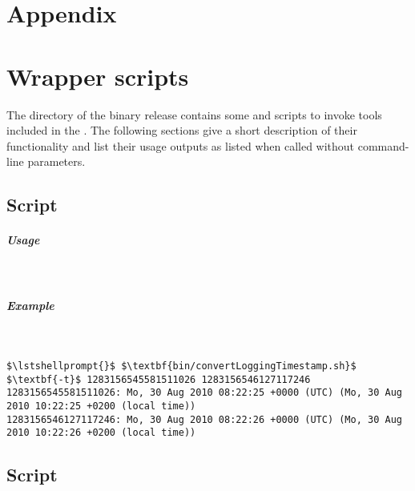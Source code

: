 % 


\appendix

\chapter*{Appendix}

\chapter{Wrapper scripts}

The  directory of the binary release contains some   and %
 scripts to invoke tools included in the \mainJar{}. %
The following sections give a short description of their functionality and %
list their usage outputs as listed when called without command-line parameters. %


\section{Script }

\paragraph*{Usage}\

\setTextListing


\paragraph*{Example}\

\setTextListing
\begin{lstlisting}
$\lstshellprompt{}$ $\textbf{bin/convertLoggingTimestamp.sh}$ $\textbf{-t}$ 1283156545581511026 1283156546127117246 
1283156545581511026: Mo, 30 Aug 2010 08:22:25 +0000 (UTC) (Mo, 30 Aug 2010 10:22:25 +0200 (local time))
1283156546127117246: Mo, 30 Aug 2010 08:22:26 +0000 (UTC) (Mo, 30 Aug 2010 10:22:26 +0200 (local time))
\end{lstlisting}

\section{Script }

